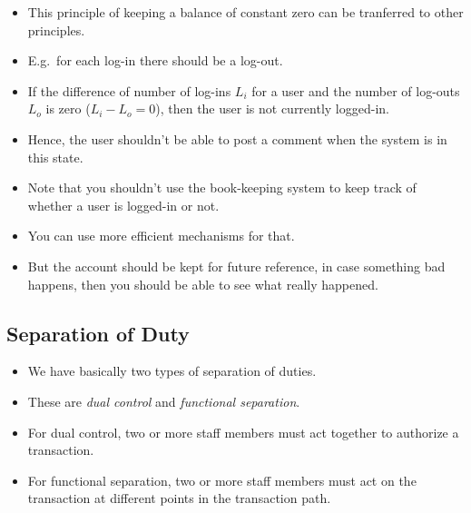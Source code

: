 \begin{frame}
  \begin{itemize}
    \item This principle of keeping a balance of constant zero can be 
      tranferred to other principles.

    \item E.g.\ for each log-in there should be a log-out.

    \item If the difference of number of log-ins \(L_i\) for a user and the 
      number of log-outs \(L_o\) is zero (\(L_i-L_o = 0\)), then the user is 
      not currently logged-in.

    \item Hence, the user shouldn't be able to post a comment when the system 
      is in this state.
  \end{itemize}
\end{frame}

\begin{frame}
  \begin{itemize}
    \item Note that you shouldn't use the book-keeping system to keep track of 
      whether a user is logged-in or not.

    \item You can use more efficient mechanisms for that.

    \item But the account should be kept for future reference, in case 
      something bad happens, then you should be able to see what really 
      happened.
  \end{itemize}
\end{frame}

\subsection{Separation of Duty}

\begin{frame}
  \begin{itemize}
    \item We have basically two types of separation of duties.
      
    \item These are \emph{dual control} and \emph{functional separation}.

    \item For dual control, two or more staff members must act together to 
      authorize a transaction.

    \item For functional separation, two or more staff members must act on the 
      transaction at different points in the transaction path.
  \end{itemize}
\end{frame}

